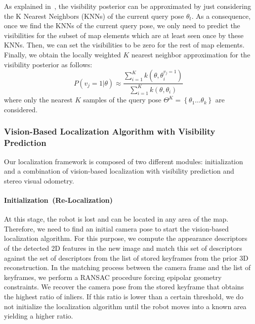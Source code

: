 As explained in~\cite{Alcantarilla11icra}, the visibility posterior
can be approximated by just considering the K Nearest Neighbors (KNNs)
of the current query pose $\theta_{t}$. As a consequence, once we find
the KNNs of the current query pose, we only need to predict the
visibilities for the subset of map elements which are at least seen
once by these KNNs. Then, we can set the visibilities to be zero for
the rest of map elements. Finally, we obtain the locally weighted $K$
nearest neighbor approximation for the visibility posterior as
follows:
%
\begin{equation} \label{eq:KNNVisibility}
P(v_{j}=1|\theta) \approx \frac{\sum\limits_{i=1}^{K}k(\theta,\theta_{i}^{v_{j}=1})}{\sum\limits_{i=1}^{K}k(\theta,\theta_{i})}
\end{equation}
%
where only the nearest $K$ samples of the query pose
$\Theta^{K}=\left\{\theta_{1} \ldots \theta_{k}\right\}$ are
considered.

\subsubsection{Vision-Based Localization Algorithm with Visibility Prediction}\label{sec:vision_algorithm}
Our localization framework is composed of two different modules:
initialization and a combination of vision-based localization with
visibility prediction and stereo visual odometry.

\paragraph{Initialization~(Re-Localization)}
At this stage, the robot is lost and can be located in any area of the
map. Therefore, we need to find an initial camera pose to start the
vision-based localization algorithm. For this purpose, we compute the
appearance descriptors of the detected 2D features in the new image
and match this set of descriptors against the set of descriptors from
the list of stored keyframes from the prior 3D reconstruction. In the
matching process between the camera frame and the list of keyframes,
we perform a RANSAC procedure forcing epipolar geometry
constraints. We recover the camera pose from the stored keyframe that
obtains the highest ratio of inliers. If this ratio is lower than a
certain threshold, we do not initialize the localization algorithm
until the robot moves into a known area yielding a higher ratio.

